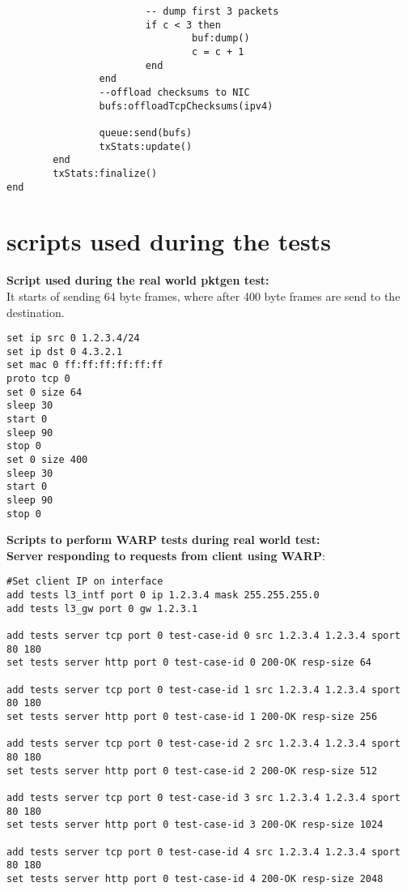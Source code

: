 \begin{landscape}
\begin{verbatim}
                        -- dump first 3 packets
                        if c < 3 then
                                buf:dump()
                                c = c + 1
                        end
                end
                --offload checksums to NIC
                bufs:offloadTcpChecksums(ipv4)

                queue:send(bufs)
                txStats:update()
        end
        txStats:finalize()
end

\end{verbatim}

\section{scripts used during the tests}\label{app:realworld}

\textbf{Script used during the real world pktgen test:}\\
It starts of sending 64 byte frames, where after 400 byte frames are send to the destination.

\begin{verbatim}
set ip src 0 1.2.3.4/24
set ip dst 0 4.3.2.1
set mac 0 ff:ff:ff:ff:ff:ff
proto tcp 0
set 0 size 64
sleep 30
start 0
sleep 90
stop 0
set 0 size 400
sleep 30
start 0
sleep 90
stop 0
\end{verbatim}

\textbf{Scripts to perform WARP tests during real world test:\\}
\textbf{Server responding to requests from client using WARP}:

\begin{verbatim}
#Set client IP on interface
add tests l3_intf port 0 ip 1.2.3.4 mask 255.255.255.0
add tests l3_gw port 0 gw 1.2.3.1 

add tests server tcp port 0 test-case-id 0 src 1.2.3.4 1.2.3.4 sport 80 180
set tests server http port 0 test-case-id 0 200-OK resp-size 64

add tests server tcp port 0 test-case-id 1 src 1.2.3.4 1.2.3.4 sport 80 180
set tests server http port 0 test-case-id 1 200-OK resp-size 256

add tests server tcp port 0 test-case-id 2 src 1.2.3.4 1.2.3.4 sport 80 180
set tests server http port 0 test-case-id 2 200-OK resp-size 512

add tests server tcp port 0 test-case-id 3 src 1.2.3.4 1.2.3.4 sport 80 180
set tests server http port 0 test-case-id 3 200-OK resp-size 1024

add tests server tcp port 0 test-case-id 4 src 1.2.3.4 1.2.3.4 sport 80 180
set tests server http port 0 test-case-id 4 200-OK resp-size 2048


\end{verbatim}
\end{landscape}
